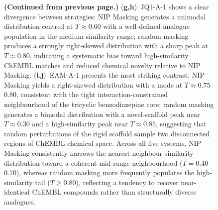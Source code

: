 \documentclass[a4paper,12pt]{article}
\begin{document}
\begin{figure}[p]
    \caption{%
        \textbf{(Continued from previous page.)}
        (\textbf{g,h})~JQ1-A-1 shows a clear divergence between
        strategies: NIP Masking generates a unimodal distribution centred at
        $T \approx 0.60$ with a well-defined analogue population
        in the medium-similarity range; random masking produces a
        strongly right-skewed distribution with a sharp peak at
        $T \approx 0.80$, indicating a systematic bias toward
        high-similarity ChEMBL matches and reduced chemical novelty
        relative to NIP Masking.
        (\textbf{i,j})~EAM-A-1 presents the most striking contrast:
        NIP Masking yields a right-skewed distribution with a mode at
        $T \approx 0.75$--$0.80$, consistent with the tight
        interaction-constrained neighbourhood of the tricyclic
        benzodiazepine core; random masking generates a bimodal
        distribution with a novel-scaffold peak near
        $T \approx 0.30$ and a high-similarity peak near
        $T \approx 0.85$, suggesting that random perturbations
        of the rigid scaffold sample two disconnected regions of
        ChEMBL chemical space.
        Across all five systems, NIP Masking consistently narrows
        the nearest-neighbour similarity distribution toward
        a coherent mid-range neighbourhood ($T = 0.40$--$0.70$),
        whereas random masking more frequently populates the
        high-similarity tail ($T \geq 0.80$), reflecting a
        tendency to recover near-identical ChEMBL compounds rather
        than structurally diverse analogues.
    }
\end{figure}
 
\end{document}
